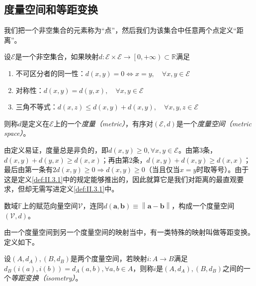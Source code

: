 \documentclass[main.tex]{subfiles}
\begin{document}
\subsection{度量空间和等距变换}
我们把一个非空集合的元素称为“点”，然后我们为该集合中任意两个点定义“距离”。

\begin{definition}[度量空间]\label{def:II.3.1}
    设$\mathcal{E}$是一个非空集合，如果映射$d:\mathcal{E}\times\mathcal{E}\rightarrow\left[0,+\infty\right)\subset\mathbb{R}$满足
    \begin{enumerate}
        \item 不可区分者的同一性：$d\left(x,y\right)=0\Leftrightarrow x=y,\quad\forall x,y\in\mathcal{E}$
        \item 对称性：$d\left(x,y\right)=d\left(y,x\right),\quad\forall x,y\in\mathcal{E}$
        \item 三角不等式：$d\left(x,z\right)\leq d\left(x,y\right)+d\left(x,y\right),\quad\forall x,y,z\in\mathcal{E}$
    \end{enumerate}
    则称$d$是定义在$\mathcal{E}$上的一个\emph{度量（metric）}，有序对$\left(\mathcal{E},d\right)$是一个\emph{度量空间（metric space）}。
\end{definition}

由定义易证，度量总是非负的，即$d\left(x,y\right)\geq0,\forall x,y\in\mathcal{E}$。由第3条，$d\left(x,y\right)+d\left(y,x\right)\geq d\left(x,x\right)$；再由第2条，$d\left(x,y\right)+d\left(x,y\right)\geq d\left(x,x\right)$；最后由第一条有$2d\left(x,y\right)\geq0\Rightarrow d\left(x,y\right)\geq0$（当且仅当$x=y$时取等号）。由于这是定义\ref{def:II.3.1}中的规定能够推出的，因此就算它是我们对距离的最直观要求，但却无需写进定义\ref{def:II.3.1}中。

\begin{example}\label{exp:II.3.1}
    数域$\mathbb{F}$上的赋范向量空间$\mathcal{V}$，连同$d\left(\mathbf{a},\mathbf{b}\right)\equiv\left\|\mathbf{a}-\mathbf{b}\right\|$，构成一个度量空间$\left(\mathcal{V},d\right)$。
\end{example}

由一个度量空间到另一个度量空间的映射当中，有一类特殊的映射叫做等距变换。定义如下。

\begin{definition}[等距变换]\label{def:II.3.2}
    设$\left(A,d_A\right),\left(B,d_B\right)$是两个度量空间，若映射$i:A\rightarrow B$满足$d_B\left(i\left(a\right),i\left(b\right)\right)=d_A\left(a,b\right),\forall a,b\in A$，则称$i$是$\left(A,d_A\right),\left(B,d_B\right)$之间的一个\emph{等距变换（isometry）}。
\end{definition}
\end{document}
